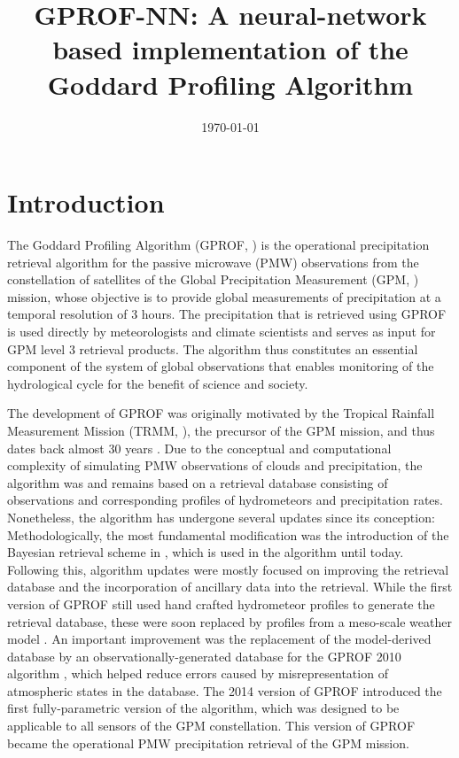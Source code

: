 \documentclass[a4paper,11pt,bibtotoc]{scrartcl}
\begin{document}
\title{GPROF-NN: A neural-network based implementation of the Goddard Profiling Algorithm}
\date{\today}

\maketitle


\section{Introduction}

The Goddard Profiling Algorithm (GPROF, \citet{kummerow15}) is the operational
precipitation retrieval algorithm for the passive microwave (PMW) observations
from the constellation of satellites of the Global Precipitation Measurement
(GPM, \citet{hou14}) mission, whose objective is to provide global measurements
of precipitation at a temporal resolution of 3 hours. The precipitation that is
retrieved using GPROF is used directly by meteorologists and climate scientists
and serves as input for GPM level 3 retrieval products. The algorithm thus
constitutes an essential component of the system of global observations that
enables monitoring of the hydrological cycle for the benefit of science and
society.

The development of GPROF was originally motivated by the Tropical Rainfall
Measurement Mission (TRMM, \citet{simpson96}), the precursor of the GPM mission,
and thus dates back almost 30 years \citep{kummerow94_a, kummerow94_b}. Due to
the conceptual and computational complexity of simulating PMW observations of
clouds and precipitation, the algorithm was and remains based on a retrieval
database consisting of observations and corresponding profiles of hydrometeors
and precipitation rates. Nonetheless, the algorithm has undergone several
updates since its conception: Methodologically, the most fundamental
modification was the introduction of the Bayesian retrieval scheme in
\citet{kummerow96}, which is used in the algorithm until today. Following this,
algorithm updates were mostly focused on improving the retrieval database and
the incorporation of ancillary data into the retrieval. While the first version
of GPROF still used hand crafted hydrometeor profiles to generate the retrieval
database, these were soon replaced by profiles from a meso-scale weather model
\citep{kummerow96}. An important improvement was the replacement of the
model-derived database by an observationally-generated database for the GPROF
2010 algorithm \citep{kummerow11, kummerow15}, which helped reduce errors caused
by misrepresentation of atmospheric states in the database. The 2014 version of
GPROF \citep{kummerow15} introduced the first fully-parametric version of the
algorithm, which was designed to be applicable to all sensors of the GPM
constellation. This version of GPROF became the operational PMW
precipitation retrieval of the GPM mission.
\end{document}
